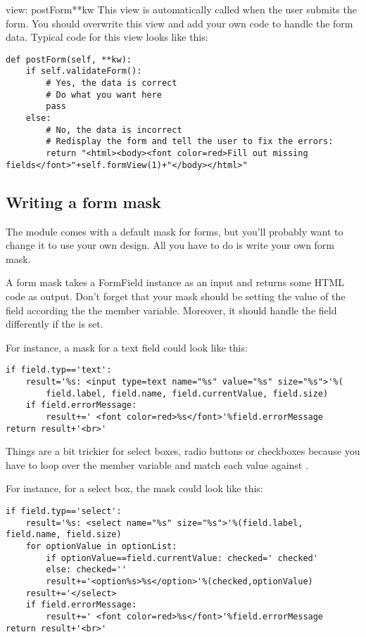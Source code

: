 \begin{funcdesc}{view: postForm}{**kw}
This view is automatically called when the user submits the form. You should overwrite this view and add your own
code to handle the form data. Typical code for this view looks like this:
\begin{verbatim}
def postForm(self, **kw):
    if self.validateForm():
        # Yes, the data is correct
        # Do what you want here
        pass
    else:
        # No, the data is incorrect
        # Redisplay the form and tell the user to fix the errors:
        return "<html><body><font color=red>Fill out missing fields</font>"+self.formView(1)+"</body></html>"
\end{verbatim}
\end{funcdesc}

\subsection{Writing a form mask}
The module comes with a default mask for forms, but you'll probably want to change it to use your own design.
All you have to do is write your own form mask.

A form mask takes a FormField instance as an input and returns some HTML code as output. Don't forget that your
mask should be setting the value of the field according the the  member variable. Moreover,
it should handle the field differently if the  is set.

For instance, a mask for a text field could look like this:
\begin{verbatim}
if field.typ=='text':
    result='%s: <input type=text name="%s" value="%s" size="%s">'%(
        field.label, field.name, field.currentValue, field.size)
    if field.errorMessage:
        result+=' <font color=red>%s</font>'%field.errorMessage
return result+'<br>'
\end{verbatim}

Things are a bit trickier for select boxes, radio buttons or checkboxes because you have to loop over
the  member variable and match each value against .

For instance, for a select box, the mask could look like this:
\begin{verbatim}
if field.typ=='select':
    result='%s: <select name="%s" size="%s">'%(field.label, field.name, field.size)
    for optionValue in optionList:
        if optionValue==field.currentValue: checked=' checked'
        else: checked=''
        result+='<option%s>%s</option>'%(checked,optionValue)
    result+='</select>
    if field.errorMessage:
        result+=' <font color=red>%s</font>'%field.errorMessage
return result+'<br>'
\end{verbatim}


